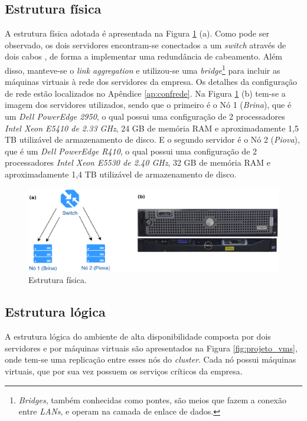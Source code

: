 \subsection{Estrutura física}

A estrutura física adotada é apresentada na Figura \ref{fig:projeto_fisico} (a). Como pode ser observado, os dois servidores encontram-se 
conectados a um \textit{switch} através de dois cabos , de forma a implementar uma redundância de cabeamento. Além disso, manteve-se o 
\textit{link aggregation} e utilizou-se uma \textit{bridge}\footnote[1]{\textit{Bridges}, também conhecidas como pontes, são meios que fazem a 
conexão entre \textit{LANs}, e operam na camada de enlace de dados.} para incluir as máquinas virtuais à rede dos servidores da empresa. 
Os detalhes da configuração de rede estão localizados no Apêndice \ref{ap:confrede}.
Na Figura \ref{fig:projeto_fisico} (b) tem-se a imagem dos servidores utilizados, sendo que o primeiro é o Nó 1 (\textit{Brina}), que é um 
\textit{Dell PowerEdge 2950}, o qual possui uma configuração de 2 processadores \textit{Intel Xeon E5410 de 2.33 GHz}, 24 GB de memória
\ac{RAM} e aproximadamente 1,5 TB utilizável de armazenamento de disco. 
E o segundo servidor é o Nó 2 (\textit{Piova}), que é um \textit{Dell PowerEdge R410}, o qual possui uma configuração de 2 processadores 
\textit{Intel Xeon E5530 de 2.40 GHz}, 32 GB de memória \ac{RAM} e aproximadamente 1,4 TB utilizável de armazenamento de disco.

\begin{figure}[h!]
 \centering
 \includegraphics[width=430px]{img/projeto_fisico.eps}
 \caption{Estrutura física.}
 \label{fig:projeto_fisico}
\end{figure}

\subsection{Estrutura lógica}

A estrutura lógica do ambiente de alta disponibilidade composta por dois servidores e por máquinas virtuais são apresentados na 
Figura \ref{fig:projeto_vms}, onde tem-se uma replicação entre esses nós do \textit{cluster}. Cada nó possui máquinas virtuais, que por sua vez
possuem os serviços críticos da empresa.

